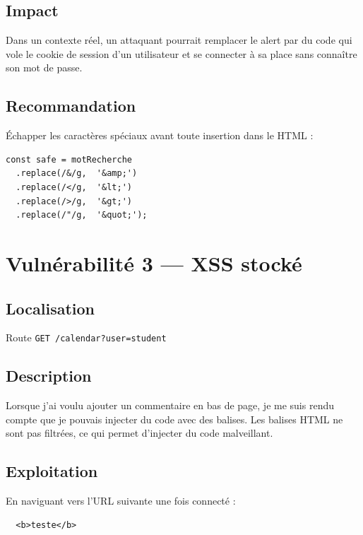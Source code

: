 \documentclass[a4paper,12pt]{article}
\begin{document}
\subsection{Impact}

Dans un contexte réel, un attaquant pourrait remplacer le alert par du code qui vole le cookie de session d'un utilisateur et se connecter à sa place sans connaître son mot de passe.

\subsection{Recommandation}

Échapper les caractères spéciaux avant toute insertion dans le HTML :

\begin{lstlisting}
const safe = motRecherche
  .replace(/&/g,  '&amp;')
  .replace(/</g,  '&lt;')
  .replace(/>/g,  '&gt;')
  .replace(/"/g,  '&quot;');
\end{lstlisting}

\newpage

\section{Vulnérabilité 3 — XSS stocké}

\subsection{Localisation}

Route \texttt{GET /calendar?user=student}

\subsection{Description}

Lorsque j'ai voulu ajouter un commentaire en bas de page, je me suis rendu compte que je pouvais injecter du code avec des balises. Les balises HTML ne sont pas filtrées, ce qui permet d'injecter du code malveillant.


\subsection{Exploitation}

En naviguant vers l'URL suivante une fois connecté :

\begin{lstlisting}
  <b>teste</b>
\end{lstlisting}
\end{document}
